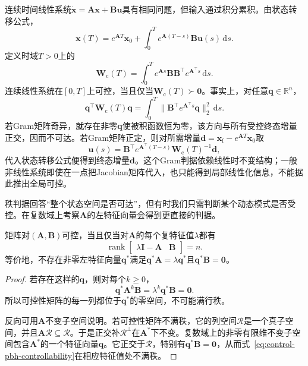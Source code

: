 连续时间线性系统$\dot{\bm{x}}=\bm{A}\bm{x}+\bm{B}\bm{u}$具有相同问题，但输入通过积分累积。由状态转移公式，
\[
  \bm{x}(T)
  =
  e^{\bm{A}T}\bm{x}_0
  +
  \int_0^T e^{\bm{A}(T-s)}\bm{B}\bm{u}(s)\,\mathrm{d}s.
\]
定义时域$T>0$上的
\begin{equation}
  \bm{W}_{\mathrm c}(T)
  =
  \int_0^T
  e^{\bm{A}s}\bm{B}\bm{B}^{\top}e^{\bm{A}^{\top}s}
  \,\mathrm{d}s.
  \label{eq:control-controllability-gramian}
\end{equation}
连续线性系统在$[0,T]$上可控，当且仅当$\bm{W}_{\mathrm c}(T)\succ\bm{0}$。事实上，对任意$\bm{q}\in\mathbb{R}^n$，
\[
  \bm{q}^{\top}\bm{W}_{\mathrm c}(T)\bm{q}
  =
  \int_0^T
  \lVert
    \bm{B}^{\top}e^{\bm{A}^{\top}s}\bm{q}
  \rVert_2^2\,\mathrm{d}s.
\]
若Gram矩阵奇异，就存在非零$\bm{q}$使被积函数恒为零，该方向与所有受控终态增量正交，因而不可达。若Gram矩阵正定，则对所需增量$\bm{d}=\bm{x}_{\mathrm f}-e^{\bm{A}T}\bm{x}_0$取
\[
  \bm{u}(s)
  =
  \bm{B}^{\top}e^{\bm{A}^{\top}(T-s)}
  \bm{W}_{\mathrm c}(T)^{-1}\bm{d},
\]
代入状态转移公式便得到终态增量$\bm{d}$。这个Gram判据依赖线性时不变结构；一般非线性系统即使在一点把Jacobian矩阵代入，也只能得到局部线性化信息，不能据此推出全局可控。

秩判据回答“整个状态空间是否可达”，但有时我们只需判断某个动态模式是否受控。在复数域上考察$\bm{A}$的左特征向量会得到更直接的判据。
\begin{theorem}
\label{thm:control-pbh-controllability}
矩阵对$(\bm{A},\bm{B})$可控，当且仅当对$\bm{A}$的每个复特征值$\lambda$都有
\begin{equation}
  \operatorname{rank}
  \begin{bmatrix}
    \lambda\bm{I}-\bm{A}&\bm{B}
  \end{bmatrix}
  =n.
  \label{eq:control-pbh-controllability}
\end{equation}
等价地，不存在非零左特征向量$\bm{q}^{\ast}$满足$\bm{q}^{\ast}\bm{A}=\lambda\bm{q}^{\ast}$且$\bm{q}^{\ast}\bm{B}=\bm{0}$。
\end{theorem}
\begin{proof}
若存在这样的$\bm{q}$，则对每个$k\geq0$，
\[
  \bm{q}^{\ast}\bm{A}^k\bm{B}
  =
  \lambda^k\bm{q}^{\ast}\bm{B}
  =\bm{0}.
\]
所以可控性矩阵的每一列都位于$\bm{q}^{\ast}$的零空间，不可能满行秩。

反向可用$\bm{A}$不变子空间说明。若可控性矩阵不满秩，它的列空间$\mathcal{R}$是一个真子空间，并且$\bm{A}\mathcal{R}\subseteq\mathcal{R}$。于是正交补$\mathcal{R}^{\perp}$在$\bm{A}^{\ast}$下不变。复数域上的非零有限维不变子空间包含$\bm{A}^{\ast}$的一个特征向量$\bm{q}$。它正交于$\mathcal{R}$，特别有$\bm{q}^{\ast}\bm{B}=\bm{0}$，从而式~\eqref{eq:control-pbh-controllability}在相应特征值处不满秩。
\end{proof}
